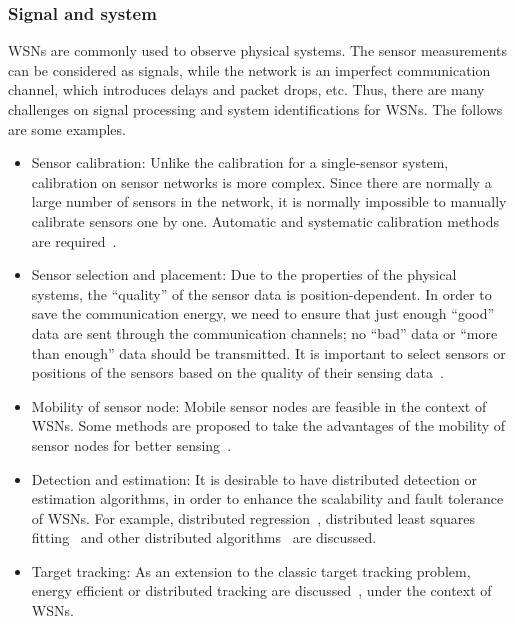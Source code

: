 \subsubsection{Signal and system}
WSNs are commonly used to observe physical systems. The sensor measurements can be considered as signals, while the network is an imperfect communication channel, which introduces delays and packet drops, etc. Thus, there are many challenges on signal processing and system identifications for WSNs. The follows are some examples.
\begin{itemize}
  \item Sensor calibration: Unlike the calibration for a single-sensor system, calibration on sensor networks is more complex. Since there are normally a large number of sensors in the network, it is normally impossible to manually calibrate sensors one by one. Automatic and systematic calibration methods are required~\cite{FengActSenCal2006,WhitehouseCuller2005}.
  \item Sensor selection and placement: Due to the properties of the physical systems, the ``quality'' of the sensor data is position-dependent. In order to save the communication energy, we need to ensure that just enough ``good'' data are sent through the communication channels; no ``bad'' data or ``more than enough'' data should be transmitted.
   It is important to select sensors or positions of the sensors based on the quality of their sensing data~\cite{zhao03collaborative,WangEstrinInfomationSS05,VuranSpatioTemporal04,YickOptBeaconPlacement04}.
  \item Mobility of sensor node: Mobile sensor nodes are feasible in the context of WSNs. Some methods are proposed to take the advantages of the mobility of sensor nodes for better sensing~\cite{SongOptMobileSensIROS05,CaoDiffGame2006,Meliou2006,MurrayDecActiveSensing}.
  \item Detection and estimation: It is desirable to have distributed detection or estimation algorithms, in order to enhance the scalability and fault tolerance of WSNs. For example, distributed regression~\cite{Guestrin2004}, distributed least squares fitting~\cite{XiaoBoydLallp2p_ls} and other distributed algorithms~\cite{RossiMonitoringDif,LiuDualSpaceAppTracking} are discussed.
  \item Target tracking: As an extension to the classic target tracking problem, energy efficient or distributed tracking are discussed~\cite{SAM2006Amit,FZhaoShinInfoDrivenDynamicTracking,AslamBinaryTrackingWSN2003,ArandaOptSensorPlacement05},
   under the context of WSNs.
\end{itemize}


